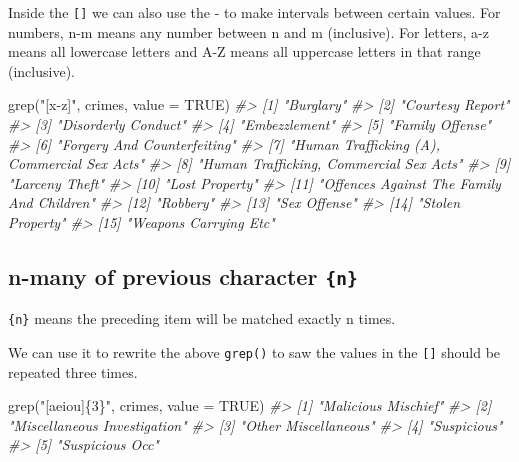 \documentclass[
  12pt,
  openany]{book}
\newenvironment{Shaded}{\begin{snugshade}}{\end{snugshade}}
\newcommand{\AttributeTok}[1]{\textcolor[rgb]{0.61,0.61,0.61}{#1}}
\newcommand{\CommentTok}[1]{\textcolor[rgb]{0.37,0.37,0.37}{\textit{#1}}}
\newcommand{\ConstantTok}[1]{\textcolor[rgb]{0,0,0}{#1}}
\newcommand{\FunctionTok}[1]{\textcolor[rgb]{0,0,0}{#1}}
\newcommand{\NormalTok}[1]{#1}
\newcommand{\StringTok}[1]{\textcolor[rgb]{0.5,0.5,0.5}{#1}}
\begin{document}
Inside the \texttt{{[}{]}} we can also use the - to make intervals between certain values. For numbers, n-m means any number between n and m (inclusive). For letters, a-z means all lowercase letters and A-Z means all uppercase letters in that range (inclusive).

\begin{Shaded}
\begin{Highlighting}[]
\FunctionTok{grep}\NormalTok{(}\StringTok{"[x{-}z]"}\NormalTok{, crimes, }\AttributeTok{value =} \ConstantTok{TRUE}\NormalTok{)}
\CommentTok{\#\textgreater{}  [1] "Burglary"                                  }
\CommentTok{\#\textgreater{}  [2] "Courtesy Report"                           }
\CommentTok{\#\textgreater{}  [3] "Disorderly Conduct"                        }
\CommentTok{\#\textgreater{}  [4] "Embezzlement"                              }
\CommentTok{\#\textgreater{}  [5] "Family Offense"                            }
\CommentTok{\#\textgreater{}  [6] "Forgery And Counterfeiting"                }
\CommentTok{\#\textgreater{}  [7] "Human Trafficking (A), Commercial Sex Acts"}
\CommentTok{\#\textgreater{}  [8] "Human Trafficking, Commercial Sex Acts"    }
\CommentTok{\#\textgreater{}  [9] "Larceny Theft"                             }
\CommentTok{\#\textgreater{} [10] "Lost Property"                             }
\CommentTok{\#\textgreater{} [11] "Offences Against The Family And Children"  }
\CommentTok{\#\textgreater{} [12] "Robbery"                                   }
\CommentTok{\#\textgreater{} [13] "Sex Offense"                               }
\CommentTok{\#\textgreater{} [14] "Stolen Property"                           }
\CommentTok{\#\textgreater{} [15] "Weapons Carrying Etc"}
\end{Highlighting}
\end{Shaded}

\hypertarget{n-many-of-previous-character-n}{%
\subsection{\texorpdfstring{n-many of previous character \texttt{\{n\}}}{n-many of previous character \{n\}}}\label{n-many-of-previous-character-n}}

\texttt{\{n\}} means the preceding item will be matched exactly n times.

We can use it to rewrite the above \texttt{grep()} to saw the values in the \texttt{{[}{]}} should be repeated three times.

\begin{Shaded}
\begin{Highlighting}[]
\FunctionTok{grep}\NormalTok{(}\StringTok{"[aeiou]\{3\}"}\NormalTok{, crimes, }\AttributeTok{value =} \ConstantTok{TRUE}\NormalTok{)}
\CommentTok{\#\textgreater{} [1] "Malicious Mischief"         }
\CommentTok{\#\textgreater{} [2] "Miscellaneous Investigation"}
\CommentTok{\#\textgreater{} [3] "Other Miscellaneous"        }
\CommentTok{\#\textgreater{} [4] "Suspicious"                 }
\CommentTok{\#\textgreater{} [5] "Suspicious Occ"}
\end{Highlighting}
\end{Shaded}
\end{document}
